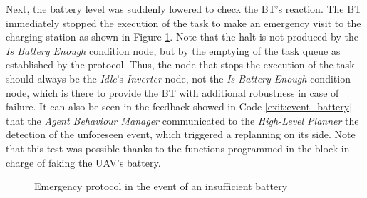 Next, the battery level was suddenly lowered to check the \gls{BT}'s reaction. The \gls{BT} immediately stopped the execution of the task to make an emergency visit to the charging station as shown in Figure \ref{fig:event_battery}. Note that the halt is not produced by the \emph{Is Battery Enough} condition node, but by the emptying of the task queue as established by the protocol. Thus, the node that stops the execution of the task should always be the \emph{Idle}'s \emph{Inverter} node, not the \emph{Is Battery Enough} condition node, which is there to provide the \gls{BT} with additional robustness in case of failure. It can also be seen in the feedback showed in Code \ref{exit:event_battery} that the \emph{Agent Behaviour Manager} communicated to the \emph{High-Level Planner} the detection of the unforeseen event, which triggered a replanning on its side. Note that this test was possible thanks to the functions programmed in the block in charge of faking the \gls{UAV}'s battery.

\begin{figure}[htbp]
    \centering
    \hfill
    \hfill
    \caption{Emergency protocol in the event of an insufficient battery}
    \label{fig:event_battery}
\end{figure}

